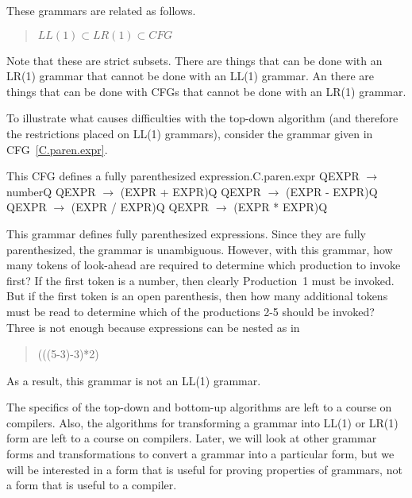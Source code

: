 \documentclass[letterpaper,12pt,openany,reqno]{book}%
\newcommand{\cfgprod}[2] {{\ttfamily #1} $\rightarrow$ {\ttfamily #2}}
\begin{document}
These grammars are related as follows.
\begin{quote}
$LL(1) \subset LR(1) \subset CFG$
\end{quote}
Note that these are strict subsets. There are things that can be done with an LR(1) grammar that cannot be done with an LL(1) grammar. An there are things that can be done with CFGs that cannot be done with an LR(1) grammar.

To illustrate what causes difficulties with the top-down algorithm (and therefore the restrictions placed on LL(1) grammars), consider the grammar given in CFG~\ref{C.paren.expr}. %
\begin{cfg}{This CFG defines a fully parenthesized expression.}{C.paren.expr}
Q\cfgprod{EXPR}{number}Q
Q\cfgprod{EXPR}{(EXPR + EXPR)}Q
Q\cfgprod{EXPR}{(EXPR - EXPR)}Q
Q\cfgprod{EXPR}{(EXPR / EXPR)}Q
Q\cfgprod{EXPR}{(EXPR * EXPR)}Q
\end{cfg}
This grammar defines fully parenthesized expressions. Since they are fully parenthesized, the grammar is unambiguous. However, with this grammar, how many tokens of look-ahead are required to determine which production to invoke first? If the first token is a number, then clearly Production~1 must be invoked. But if the first token is an open parenthesis, then how many additional tokens must be read to determine which of the productions 2-5 should be invoked? Three is not enough because expressions can be nested as in 
\begin{quote}
(((5-3)-3)*2)
\end{quote}
As a result, this grammar is not an LL(1) grammar.

The specifics of the top-down and bottom-up algorithms are left to a course on compilers. Also, the algorithms for transforming a grammar into LL(1) or LR(1) form are left to a course on compilers. Later, we will look at other grammar forms and transformations to convert a grammar into a particular form, but we will be interested in a form that is useful for proving properties of grammars, not a form that is useful to a compiler.
\end{document}
